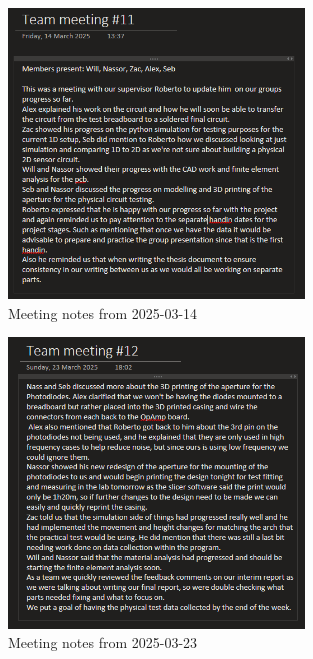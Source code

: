                                     
                                    \begin{figure}[htbp]
                                        \centering
                                        \includegraphics[width=0.7\textwidth]{figures/Appendix-MeetingNotes/meeting_note_11.png}
                                        \caption*{Meeting notes from 2025-03-14} 
                                        \label{fig:meeting11}
                                        \end{figure}

                                        

                                        \begin{figure}[htbp]
                                            \centering
                                            \includegraphics[width=0.7\textwidth]{figures/Appendix-MeetingNotes/meetingNote12.png}
                                            \caption*{Meeting notes from 2025-03-23} 
                                            \label{fig:meeting12}
                                            \end{figure}